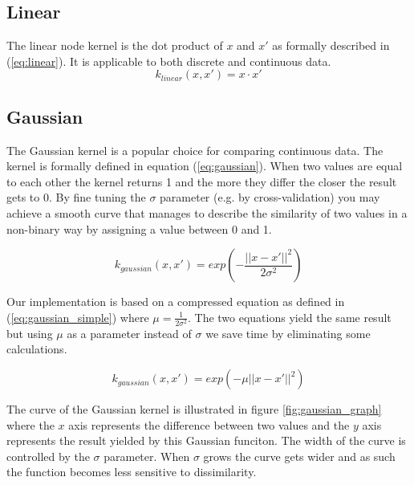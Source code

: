 \documentclass{article}
\begin{document}
\subsection{Linear}
The linear node kernel is the dot product of $x$ and $x'$ as formally described in (\ref{eq:linear}). It is applicable to both discrete and continuous data.
\begin{equation}
\label{eq:linear}
k_{linear}(x, x') = x \cdot x'
\end{equation}

\subsection{Gaussian}
The Gaussian kernel is a popular choice for comparing continuous data. The kernel is formally defined in equation (\ref{eq:gaussian}). When two values are equal to each other the kernel returns 1 and the more they differ the closer the result gets to 0. By fine tuning the $\sigma$ parameter (e.g. by cross-validation) you may achieve a smooth curve that manages to describe the similarity of two values in a non-binary way by assigning a value between 0 and 1.

\begin{equation}
\label{eq:gaussian}
k_{gaussian}(x, x') = exp(-\frac{||x - x'||^2}{2\sigma^2})
\end{equation}

Our implementation is based on a compressed equation as defined in (\ref{eq:gaussian_simple}) where $\mu=\frac{1}{2\sigma^2}$. The two equations yield the same result but using $\mu$ as a parameter instead of $\sigma$ we save time by eliminating some calculations.

\begin{equation}
\label{eq:gaussian_simple}
k_{gaussian}(x, x') = exp(-\mu ||x - x'||^2)
\end{equation}

The curve of the Gaussian kernel is illustrated in figure \ref{fig:gaussian_graph} where the $x$ axis represents the difference between two values and the $y$ axis represents the result yielded by this Gaussian funciton. The width of the curve is controlled by the $\sigma$ parameter. When $\sigma$ grows the curve gets wider and as such the function becomes less sensitive to dissimilarity.
\end{document}
